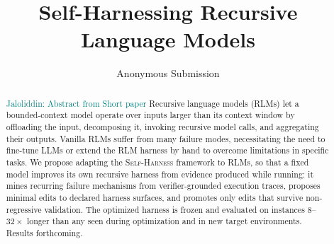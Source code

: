 \documentclass[letterpaper]{article} %
\title{Self-Harnessing Recursive Language Models}
\author{
    Anonymous Submission
}
\newcommand{\JB}[1]{\textcolor{teal}{Jaloliddin: #1}}
\newcommand{\rlms}{\textsc{RLM}s\xspace}
\newcommand{\sh}{\textsc{Self-Harness}\xspace}
\begin{document}
\maketitle



\begin{abstract}
\JB{Abstract from Short paper}
Recursive language models (\rlms) let a bounded-context model operate over inputs larger
than its context window by offloading the input, decomposing it, invoking recursive model
calls, and aggregating their outputs. Vanilla RLMs suffer from many failure
modes, necessitating the need to fine-tune LLMs or extend the RLM harness by hand to overcome limitations in specific tasks. We propose adapting the \sh{} framework to \rlms, so that a fixed model improves its own recursive harness from evidence produced while running: it mines recurring failure mechanisms from verifier-grounded execution traces, proposes minimal edits to declared harness surfaces, and promotes only edits that survive non-regressive
validation. The optimized harness is frozen and evaluated on instances $8$--$32\times$
longer than any seen during optimization and in new target environments. Results forthcoming.
\end{abstract}

\end{document}
